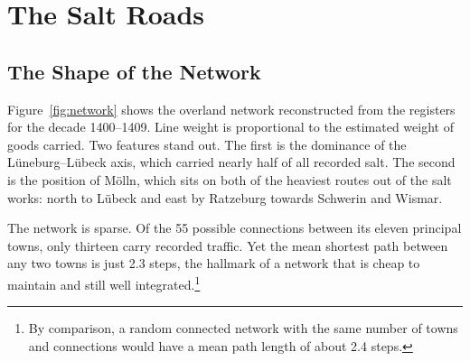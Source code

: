 \chapter{The Salt Roads}
\label{ch:salt}

\section{The Shape of the Network}

Figure~\ref{fig:network} shows the overland network reconstructed from the registers for the decade 1400--1409. Line weight is proportional to the estimated weight of goods carried. Two features stand out. The first is the dominance of the Lüneburg--Lübeck axis, which carried nearly half of all recorded salt. The second is the position of Mölln, which sits on both of the heaviest routes out of the salt works: north to Lübeck and east by Ratzeburg towards Schwerin and Wismar.

The network is sparse. Of the 55 possible connections between its eleven principal towns, only thirteen carry recorded traffic. Yet the mean shortest path between any two towns is just 2.3 steps, the hallmark of a network that is cheap to maintain and still well integrated.\footnote{By comparison, a random connected network with the same number of towns and connections would have a mean path length of about 2.4 steps.}

